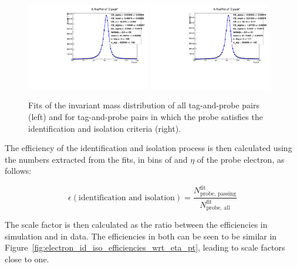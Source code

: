 \begin{figure}[hbtp]
    \centering
      \includegraphics[width=0.48\textwidth]{Chapters/04_Analysis/04b_XSections/images/lepton_scale_factors/CBConvolution/electron/data/id_iso/tagProbe_total_Z_peak}\hfill
      \includegraphics[width=0.48\textwidth]{Chapters/04_Analysis/04b_XSections/images/lepton_scale_factors/CBConvolution/electron/data/id_iso/tagProbe_passed_Z_peak}\\
     \caption{Fits of the invariant mass distribution of all tag-and-probe pairs (left) and for
     tag-and-probe pairs in which the probe satisfies the identification and isolation criteria
     (right).}
     \label{fig:electron_id_iso_efficiency_invariant_Z_mass_fits}
\end{figure}

The efficiency of the identification and isolation process is then calculated using the numbers extracted
from the fits, in bins of \pt and $\eta$ of the probe electron, as follows:

\begin{equation}
\epsilon(\text{identification and isolation}) = \frac{N^{\text{fit}}_{\text{probe, passing}}}{N^{\text{fit}}_{\text{probe, all}}}
\end{equation}

The scale factor is then calculated as the ratio between the efficiencies in simulation and in data. The
efficiencies in both can be seen to be similar in Figure~\ref{fig:electron_id_iso_efficiencies_wrt_eta_pt},
leading to scale factors close to one.

